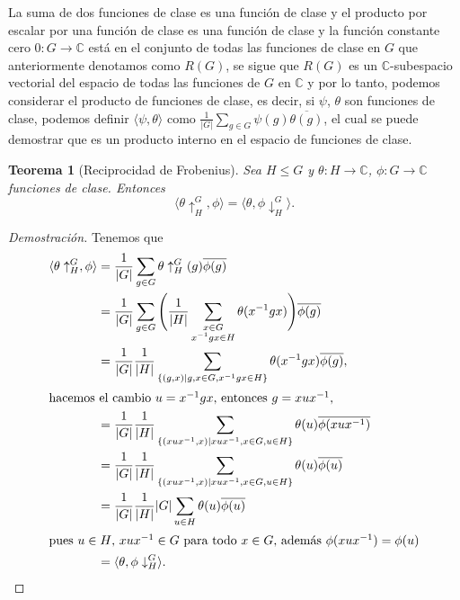\documentclass[12pt]{book}
\newtheorem{theorem}{Teorema}[section]
\theoremstyle{definition}
\newcounter{in}
\newcounter{ini}
\begin{document}
La suma de dos funciones de clase es una función de clase y el
producto por escalar por una función de clase es una función de clase
y la función constante cero $0:G\rightarrow \mathbb{C}$ está en el conjunto de todas las funciones de clase en $G$
que anteriormente denotamos como $R(G)$, se sigue que $R(G)$ es un $\mathbb{C}$-subespacio vectorial
del espacio de todas las funciones  de $G$ en $\mathbb{C}$ y por lo
tanto, podemos considerar el producto de funciones de clase, es decir,
si $\psi$, $\theta$ son funciones de clase, podemos definir
$\langle\psi,\theta\rangle$ como $\frac{1}{|G|}\sum_{g\in
  G}\psi(g)\overline{\theta(g)}$, el cual se puede demostrar que es un producto
interno en el espacio de funciones de clase.
\begin{theorem}[Reciprocidad de Frobenius]
  \label{frobenius}
  Sea $H\leq G$ y $\theta:H\rightarrow\mathbb{C}$,
  $\phi:G\rightarrow \mathbb{C}$ funciones de
  clase. Entonces
  \begin{equation*}
    \langle\theta\uparrow^{G}_{H},\phi\rangle=\langle\theta,\phi\downarrow^{G}_{H}\rangle.
  \end{equation*}
\end{theorem}
\begin{proof}[Demostración]
  Tenemos que 
  \begin{align*}
    \langle\theta\uparrow^{G}_{H},\phi\rangle&=\frac{1}{|G|}\sum_{g\in
      G}\theta\uparrow^{G}_{H}(g)\overline{\phi(g)}\\
    &=\frac{1}{|G|}\sum_{g\in G}\Bigg(\frac{1}{|H|}\sum_{\substack{x\in
        G\\x^{-1}gx\in H}}\theta(x^{-1}gx)\Bigg)\overline{\phi(g)}\\
    &=\frac{1}{|G|}\frac{1}{|H|}\sum_{\{(g,x)\mid g,x\in G,x^{-1}gx\in
      H\}}\theta(x^{-1}gx)\overline{\phi(g)},\\
    \intertext{hacemos el cambio $u=x^{-1}gx$, entonces $g=xux^{-1}$,}
    &=\frac{1}{|G|}\frac{1}{|H|}\sum_{\{(xux^{-1},x)\mid xux^{-1},x\in
      G,u\in H\}}\theta(u)\overline{\phi(xux^{-1})}\\
    &=\frac{1}{|G|}\frac{1}{|H|}\sum_{\{(xux^{-1},x)\mid xux^{-1},x\in G,u\in H\}}\theta(u)\overline{\phi(u)}\\
    &=\frac{1}{|G|}\frac{1}{|H|}|G|\sum_{u\in
      H}\theta(u)\overline{\phi(u)}\\
    \intertext{pues $u\in H$, $xux^{-1}\in G$ para todo $x\in G$,
      además $\phi(xux^{-1})=\phi(u)$}
    &=\langle\theta,\phi\downarrow^{G}_{H}\rangle.
 \end{align*} 
\end{proof}
\end{document}
